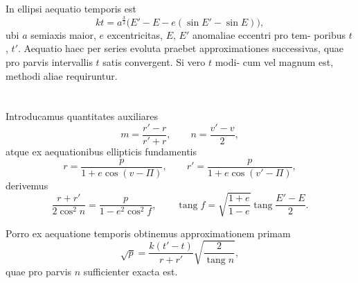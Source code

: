 \documentclass[12pt,a4paper]{article}
\newcommand{\tang}{\mathop{\mathrm{tang}}\nolimits}
\begin{document}
\section{}

In ellipsi aequatio temporis est
\begin{equation}
kt = a^{\frac{3}{2}}\bigl(E' - E - e(\sin E' - \sin E)\bigr),
\end{equation}
ubi $a$ semiaxis maior, $e$ excentricitas, $E$, $E'$ anomaliae eccentri pro tem-
poribus $t$, $t'$. Aequatio haec per series evoluta praebet approximationes
successivas, quae pro parvis intervallis $t$ satis convergent. Si vero $t$ modi-
cum vel magnum est, methodi aliae requiruntur.

\section{}

Introducamus quantitates auxiliares
\[
m = \frac{r' - r}{r' + r}, \qquad n = \frac{v' - v}{2},
\]
atque ex aequationibus ellipticis fundamentis
\[
r = \frac{p}{1 + e\cos(v - \Pi)}, \qquad r' = \frac{p}{1 + e\cos(v' - \Pi)},
\]
derivemus
\begin{equation}
\frac{r + r'}{2\cos^2 n} = \frac{p}{1 - e^2\cos^2 f}, \qquad
\tang f = \sqrt{\frac{1 + e}{1 - e}}\tang\frac{E' - E}{2}.
\end{equation}

Porro ex aequatione temporis obtinemus approximationem primam
\begin{equation}
\surd p = \frac{k(t' - t)}{r + r'}\sqrt{\frac{2}{\tang n}},
\end{equation}
quae pro parvis $n$ sufficienter exacta est.

\section{}
\end{document}

